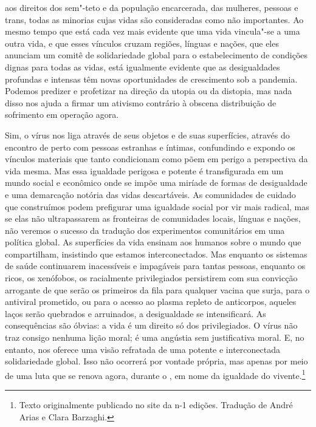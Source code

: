 aos direitos dos sem"-teto e da população encarcerada, das mulheres,
pessoas {} e trans, todas as minorias cujas vidas são
consideradas como não importantes. Ao mesmo tempo que está cada vez mais
evidente que uma vida vincula"-se a uma outra vida, e que esses vínculos
cruzam regiões, línguas e nações, que eles anunciam um comitê de
solidariedade global para o estabelecimento de condições dignas para
todas as vidas, está igualmente evidente que as desigualdades profundas
e intensas têm novas oportunidades de crescimento sob a pandemia.
Podemos predizer e profetizar na direção da utopia ou da distopia, mas
nada disso nos ajuda a firmar um ativismo contrário à obscena
distribuição de sofrimento em operação agora.

Sim, o vírus nos liga através de seus objetos e de suas superfícies,
através do encontro de perto com pessoas estranhas e íntimas,
confundindo e expondo os vínculos materiais que tanto condicionam como
põem em perigo a perspectiva da vida mesma. Mas essa igualdade perigosa
e potente é transfigurada em um mundo social e econômico onde se impõe
uma miríade de formas de desigualdade e uma demarcação notória das vidas
descartáveis. As comunidades de cuidado que construímos podem prefigurar
uma igualdade social por vir mais radical, mas se elas não ultrapassarem
as fronteiras de comunidades locais, línguas e nações, não veremos o
sucesso da tradução dos experimentos comunitários em uma política
global. As superfícies da vida ensinam aos humanos sobre o mundo que
compartilham, insistindo que estamos interconectados. Mas enquanto os
sistemas de saúde continuarem inacessíveis e impagáveis para tantas
pessoas, enquanto os ricos, os xenófobos, os racialmente privilegiados
persistirem com sua convicção arrogante de que serão os primeiros da
fila para qualquer vacina que surja, para o antiviral prometido, ou para
o acesso ao plasma repleto de anticorpos, aqueles laços serão quebrados
e arruinados, a desigualdade se intensificará. As consequências são
óbvias: a vida é um direito só dos privilegiados. O vírus não traz
consigo nenhuma lição moral; é uma angústia sem justificativa moral. E,
no entanto, nos oferece uma visão refratada de uma potente e
interconectada solidariedade global. Isso não ocorrerá por vontade
própria, mas apenas por meio de uma luta que se renova agora, durante o
{}, em nome da igualdade do vivente.\footnote[1]{Texto originalmente publicado no site da n-1 edições. Tradução de André Arias e Clara Barzaghi.}

\pagebreak %

